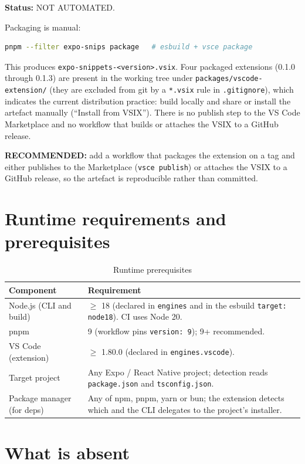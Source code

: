\textbf{Status:} NOT AUTOMATED.

Packaging is manual:

\begin{lstlisting}[language=bash]
pnpm --filter expo-snips package   # esbuild + vsce package
\end{lstlisting}

This produces \texttt{expo-snippets-<version>.vsix}. Four packaged extensions
(0.1.0 through 0.1.3) are present in the working tree under
\texttt{packages/vscode-extension/} (they are excluded from git by a
\texttt{*.vsix} rule in \texttt{.gitignore}), which indicates the current
distribution practice: build locally and share or install the artefact manually
(``Install from VSIX''). There is no publish step to the VS Code Marketplace and
no workflow that builds or attaches the VSIX to a GitHub release.

\textbf{RECOMMENDED:} add a workflow that packages the extension on a tag and
either publishes to the Marketplace (\texttt{vsce publish}) or attaches the VSIX
to a GitHub release, so the artefact is reproducible rather than committed.

\section{Runtime requirements and prerequisites}

\begin{longtable}{p{4cm}p{10.2cm}}
\caption{Runtime prerequisites}\\
\toprule
\textbf{Component} & \textbf{Requirement} \\
\midrule

Node.js (CLI and build) & $\geq$ 18 (declared in \texttt{engines} and in the
esbuild \texttt{target: node18}). CI uses Node 20. \\
pnpm & 9 (workflow pins \texttt{version: 9}); 9+ recommended. \\
VS Code (extension) & $\geq$ 1.80.0 (declared in \texttt{engines.vscode}). \\
Target project & Any Expo / React Native project; detection reads
\texttt{package.json} and \texttt{tsconfig.json}. \\
Package manager (for deps) & Any of npm, pnpm, yarn or bun; the extension detects
which and the CLI delegates to the project's installer. \\
\bottomrule
\end{longtable}

\section{What is absent}

